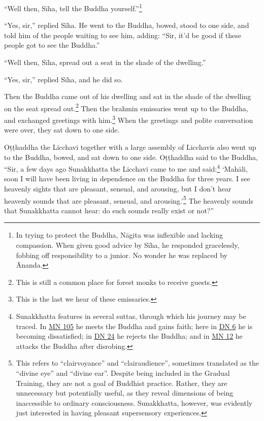 \documentclass[12pt,openany]{book}%
\begin{document}
“Well then, \textsanskrit{Sīha}, tell the Buddha yourself.”\footnote{In trying to protect the Buddha, \textsanskrit{Nāgita} was inflexible and lacking compassion. When given good advice by \textsanskrit{Sīha}, he responded gracelessly, fobbing off responsibility to a junior. No wonder he was replaced by Ānanda. } 

“Yes, sir,” replied \textsanskrit{Sīha}. He went to the Buddha, bowed, stood to one side, and told him of the people waiting to see him, adding: “Sir, it’d be good if these people got to see the Buddha.” 

“Well then, \textsanskrit{Sīha}, spread out a seat in the shade of the dwelling.” 

“Yes, sir,” replied \textsanskrit{Sīha}, and he did so. 

Then the Buddha came out of his dwelling and sat in the shade of the dwelling on the seat spread out.\footnote{This is still a common place for forest monks to receive guests. } Then the brahmin emissaries went up to the Buddha, and exchanged greetings with him.\footnote{This is the last we hear of these emissaries. } When the greetings and polite conversation were over, they sat down to one side. 

\textsanskrit{Oṭṭhaddha} the Licchavi together with a large assembly of Licchavis also went up to the Buddha, bowed, and sat down to one side. \textsanskrit{Oṭṭhaddha} said to the Buddha, “Sir, a few days ago Sunakkhatta the Licchavi came to me and said:\footnote{Sunakkhatta features in several suttas, through which his journey may be traced. In \href{https://suttacentral.net/mn105/en/sujato}{MN 105} he meets the Buddha and gains faith; here in \href{https://suttacentral.net/dn6/en/sujato}{DN 6} he is becoming dissatisfied; in \href{https://suttacentral.net/dn24/en/sujato}{DN 24} he rejects the Buddha; and in \href{https://suttacentral.net/mn12/en/sujato}{MN 12} he attacks the Buddha after disrobing. } ‘\textsanskrit{Mahāli}, soon I will have been living in dependence on the Buddha for three years. I see heavenly sights that are pleasant, sensual, and arousing, but I don’t hear heavenly sounds that are pleasant, sensual, and arousing.’\footnote{This refers to “clairvoyance” and “clairaudience”, sometimes translated as the “divine eye” and “divine ear”. Despite being included in the Gradual Training, they are not a goal of Buddhist practice. Rather, they are unnecessary but potentially useful, as they reveal dimensions of being inaccessible to ordinary consciousness. Sunakkhatta, however, was evidently just interested in having pleasant supersensory experiences. } The heavenly sounds that Sunakkhatta cannot hear: do such sounds really exist or not?” 
\end{document}
